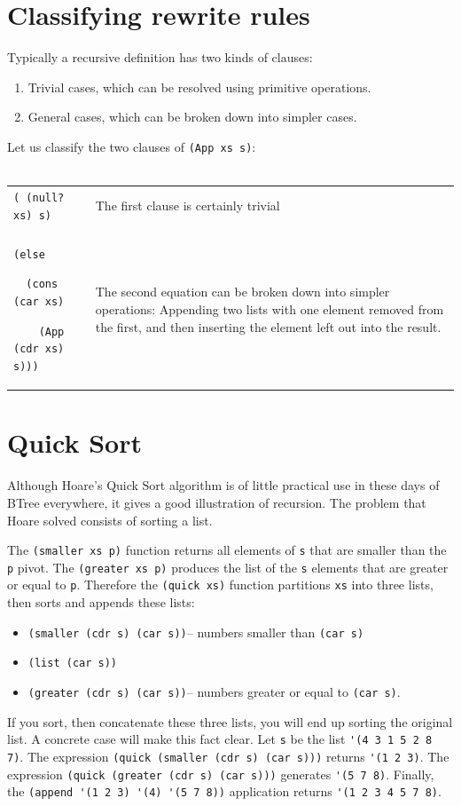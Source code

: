 \documentclass[a4paper,12pt]{book}
\begin{document}
\section{Classifying rewrite rules}
Typically a recursive definition has two kinds of clauses:
\begin{enumerate}
\item Trivial cases, which can be  
resolved using primitive operations.
\item General cases, which can be  
broken down into simpler cases.
\end{enumerate}
Let us classify the two clauses of \verb|(App xs s)|:\\

\verb||\\
\begin{tabular}{p{5cm}p{7cm}}
\verb|( (null? xs) s)| & The first clause is certainly trivial\\
\\
\verb|(else |

\verb|  (cons (car xs)|

\verb|    (App (cdr xs) s)))|
& The second equation can be
broken down into simpler
operations: Appending two
lists with one element
removed from the first,
and then inserting the element
left out into the result.\\
\end{tabular}


\section{Quick Sort}
Although Hoare's Quick Sort algorithm is
of little practical use in these days of BTree everywhere, it gives a good illustration
of recursion. The problem that Hoare solved consists of sorting a list.

The \verb|(smaller xs p)| function returns
all elements of \verb|s| that are smaller
than the \verb|p| pivot. 
The \verb|(greater xs p)| produces the
list of the \verb|s| elements that are
greater or equal to \verb|p|. Therefore the
\verb|(quick xs)| function partitions 
\verb|xs| into three lists, then sorts
and appends these lists:
\begin{itemize}
\item \verb|(smaller (cdr s) (car s))|--
numbers smaller than \verb|(car s)|
\item \verb|(list (car s))| 
\item \verb|(greater (cdr s) (car s))|--
numbers greater or equal to \verb|(car s)|.
\end{itemize}
If you sort, then concatenate these three lists,
you will end up sorting the original list.
A concrete case will make this fact clear.
Let \verb|s| be the list \verb|'(4 3 1 5 2 8 7)|.
The expression
\verb|(quick (smaller (cdr s) (car s)))|
returns \verb|'(1 2 3)|.
The expression
\verb|(quick (greater (cdr s) (car s)))|
generates \verb|'(5 7 8)|. Finally, 
the 
\verb|(append '(1 2 3) '(4) '(5 7 8))|
application
returns \verb|'(1 2 3 4 5 7 8)|.
\end{document}
